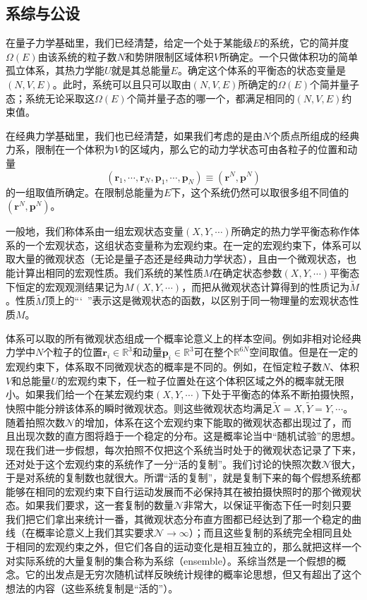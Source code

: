 \documentclass[main.tex]{subfiles}
\begin{document}
\subsection{系综与公设}


在量子力学基础里，我们已经清楚，给定一个处于某能级$E$的系统，它的简并度$\Omega\left(E\right)$由该系统的粒子数$N$和势阱限制区域体积$V$所确定。一个只做体积功的简单孤立体系，其热力学能$U$就是其总能量$E$。确定这个体系的平衡态的状态变量是$\left(N,V,E\right)$。此时，系统可以且只可以取由$\left(N,V,E\right)$所确定的$\Omega\left(E\right)$个简并量子态；系统无论采取这$\Omega\left(E\right)$个简并量子态的哪一个，都满足相同的$\left(N,V,E\right)$约束值。

在经典力学基础里，我们也已经清楚，如果我们考虑的是由$N$个质点所组成的经典力系，限制在一个体积为$V$的区域内，那么它的动力学状态可由各粒子的位置和动量
\[\left(\mathbf{r}_1,\cdots,\mathbf{r}_N,\mathbf{p}_1,\cdots,\mathbf{p}_N\right)\equiv\left(\mathbf{r}^N,\mathbf{p}^N\right)\]
的一组取值所确定。在限制总能量为$E$下，这个系统仍然可以取很多组不同值的$\left(\mathbf{r}^N,\mathbf{p}^N\right)$。

一般地，我们称体系由一组宏观状态变量$\left(X,Y,\cdots\right)$所确定的热力学平衡态称作体系的一个宏观状态，这组状态变量称为宏观约束。在一定的宏观约束下，体系可以取大量的微观状态（无论是量子态还是经典动力学状态），且由一个微观状态，也能计算出相同的宏观性质。我们系统的某性质$M$在确定状态参数$\left(X,Y,\cdots\right)$平衡态下恒定的宏观观测结果记为$M\left(X,Y,\cdots\right)$，而把从微观状态计算得到的性质记为$\tilde{M}$。性质$\tilde{M}$顶上的“\char`~”表示这是微观状态的函数，以区别于同一物理量的宏观状态性质$M$。

体系可以取的所有微观状态组成一个概率论意义上的样本空间。例如非相对论经典力学中$N$个粒子的位置$\mathbf{r}_i\in\mathbb{R}^3$和动量$\mathbf{p}_i\in\mathbb{R}^3$可在整个$\mathbb{R}^{6N}$空间取值。但是在一定的宏观约束下，体系取不同微观状态的概率是不同的。例如，在恒定粒子数$N$、体积$V$和总能量$U$的宏观约束下，任一粒子位置处在这个体积区域之外的概率就无限小。如果我们给一个在某宏观约束$\left(X,Y,\cdots\right)$下处于平衡态的体系不断拍摄快照，快照中能分辨该体系的瞬时微观状态。则这些微观状态均满足$\tilde{X}=X,\tilde{Y}=Y,\cdots$。随着拍照次数$\mathcal{N}$的增加，体系在这个宏观约束下能取的微观状态都出现过了，而且出现次数的直方图将趋于一个稳定的分布。这是概率论当中“随机试验”的思想。现在我们进一步假想，每次拍照不仅把这个系统当时处于的微观状态记录了下来，还对处于这个宏观约束的系统作了一分“活的复制”。我们讨论的快照次数$\mathcal{N}$很大，于是对系统的复制数也就很大。所谓“活的复制”，就是复制下来的每个假想系统都能够在相同的宏观约束下自行运动发展而不必保持其在被拍摄快照时的那个微观状态。如果我们要求，这一套复制的数量$\mathcal{N}$非常大，以保证平衡态下任一时刻只要我们把它们拿出来统计一番，其微观状态分布直方图都已经达到了那一个稳定的曲线（在概率论意义上我们其实要求$\mathcal{N}\rightarrow\infty$）；而且这些复制的系统完全相同且处于相同的宏观约束之外，但它们各自的运动变化是相互独立的，那么就把这样一个对实际系统的大量复制的集合称为系综（ensemble）。系综当然是一个假想的概念。它的出发点是无穷次随机试样反映统计规律的概率论思想，但又有超出了这个想法的内容（这些系统复制是“活的”）。
\end{document}
